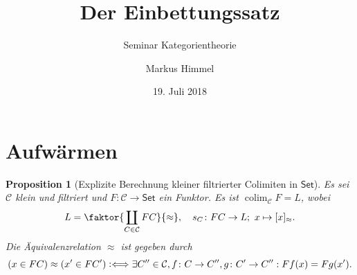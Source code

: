 \documentclass[a4paper, parskip=half]{scrartcl}
\subtitle{Seminar Kategorientheorie}
\title{Der Einbettungssatz}
\author{Markus Himmel}
\date{19. Juli 2018}
\theoremstyle{marginbreak}
\newtheorem{proposition}[remark]{Proposition}
\theoremstyle{nonumberplain}
\newcommand{\defiff}{\mathrel{\vcentcolon\Longleftrightarrow}}
\newcommand\ccat\mathsf
\newcommand\cat\mathcal
\DeclareMathOperator{\colim}{colim}
\begin{document}
	\maketitle
	\setcounter{section}{-1}

	\section{Aufwärmen}
		\begin{proposition}[Explizite Berechnung kleiner filtrierter Colimiten in $\ccat{Set}$]\label{2-13-3}
			Es sei $\cat{C}$ klein und filtriert und $F\colon \cat{C}\to\ccat{Set}$ ein
			Funktor. Es ist $\colim_\cat{C} F = L$, wobei
			\[
				L=\faktor{\coprod_{C\in\cat{C}}FC}{\approx},\quad s_C\colon FC\to L;\ x\mapsto [x]_\approx.
			\]
			Die Äquivalenzrelation $\approx$ ist gegeben durch
			\[
				(x\in FC) \approx (x'\in FC') \defiff \exists C''\in\cat{C}, f\colon C\to C'', g\colon C'\to C'': Ff(x) = Fg(x').
			\]
		\end{proposition}
\end{document}

